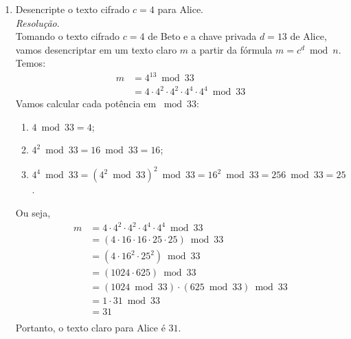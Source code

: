\begin{enumerate}
	\item Desencripte o texto cifrado $c = 4$ para Alice. \\
	\emph{Resolução}. \\
	Tomando o texto cifrado $c = 4$ de Beto e a chave privada $d = 13$ de Alice, vamos desencriptar em um texto claro $m$ a partir da fórmula $m = c^d \bmod{n}$. \\
	Temos:
	\begin{align*}
		m &= 4^{13} \bmod{33} \\ 
		&= 4 \cdot 4^2 \cdot 4^2 \cdot 4^4 \cdot 4^4 \bmod{33}
	\end{align*}
	Vamos calcular cada potência em $\bmod{33}$:
	\begin{enumerate}
		\item $4 \bmod{33} = 4$;
		\item $4^2 \bmod{33} = 16 \bmod{33} = 16$;
		\item $4^4 \bmod{33} = (4^2 \bmod{33})^2 \bmod{33} = 16^2 \bmod{33} = 256 \bmod{33} = 25$.
	\end{enumerate}
	Ou seja,
	\begin{align*}
		m &= 4 \cdot 4^2 \cdot 4^2 \cdot 4^4 \cdot 4^4 \bmod{33} \\
		&= (4 \cdot 16 \cdot 16 \cdot 25 \cdot 25) \bmod{33} \\
		&= (4 \cdot 16^2 \cdot 25^2) \bmod{33} \\
		&= (1024 \cdot 625) \bmod{33} \\
		&= (1024 \bmod{33}) \cdot (625 \bmod{33}) \bmod{33} \\
		&= 1 \cdot 31 \bmod{33} \\
		&= 31 \\
	\end{align*}
	Portanto, o texto claro para Alice é $31$.
\end{enumerate}
